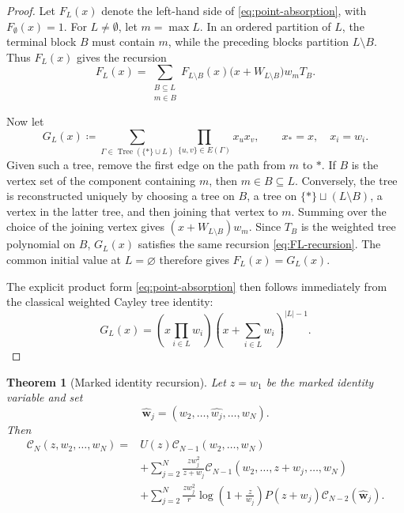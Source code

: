 \documentclass[letterpaper,12pt]{amsart}
\newtheorem{thm}{Theorem}[section]
\theoremstyle{definition}
\newcommand{\scrC}{\mathscr C}
\DeclareMathOperator{\Tree}{Tree}
\numberwithin{equation}{section}
\begin{document}
\begin{proof}
Let $F_L(x)$ denote the left-hand side of \eqref{eq:point-absorption}, with $F_\emptyset(x)=1$. For $L \neq \emptyset$, let $m = \max L$. In an ordered partition of
$L$, the terminal block $B$ must contain $m$, while the preceding blocks partition $L \setminus B$. Thus $F_L(x)$ gives the recursion
\begin{equation}
	F_L(x)=
	\sum_{\substack{B\subseteq L\\ m\in B}}
	F_{L\setminus B}(x)
	\bigl(x+W_{L\setminus B}\bigr)w_mT_B .
	\label{eq:FL-recursion}
\end{equation}

Now let
\[
  G_L(x)\coloneqq
  \sum_{\Gamma\in\Tree(\{*\}\cup L)}
  \prod_{\{u,v\}\in E(\Gamma)}x_ux_v,
  \qquad 
  x_*=x,
  \quad 
  x_i=w_i.
\]
Given such a tree, remove the first edge on the path from \(m\) to \(*\).
If \(B\) is the vertex set of the component containing \(m\), then
\(m\in B\subseteq L\).  Conversely, the tree is reconstructed uniquely by
choosing a tree on \(B\), a tree on
\(\{*\}\sqcup(L\setminus B)\), a vertex in the latter tree, and then joining
that vertex to \(m\).  Summing over the choice of the joining vertex gives
\((x+W_{L\setminus B})w_m\).
Since \(T_B\) is the weighted tree polynomial on \(B\), \(G_L(x)\) satisfies
the same recursion \eqref{eq:FL-recursion}.  The common initial value
at \(L=\varnothing\) therefore gives \(F_L(x)=G_L(x)\).
	
The explicit product form \eqref{eq:point-absorption} then follows immediately from the classical weighted Cayley tree identity:
\[
  G_L(x)
  =
  \left(x\prod_{i\in L}w_i\right)
  \left(x+\sum_{i\in L}w_i\right)^{|L|-1}.
\]
\end{proof}


\begin{thm}[Marked identity recursion]\label{thm:marked-recursion}
Let \(z=w_1\) be the marked identity variable and set
\[
  \widehat{\mathbf w}_j=(w_2,\ldots,\widehat{w_j},\ldots,w_N).
\]
Then
  \begin{equation}\label{eq:marked-recursion}
  \begin{aligned}
    \scrC_N(z,w_2,\ldots,w_N)
    ={}&U(z)\scrC_{N-1}(w_2,\ldots,w_N)
    \\
    &+\sum_{j=2}^{N}\frac{zw_j^2}{z+w_j}
    \scrC_{N-1}(w_2,\ldots,z+w_j,\ldots,w_N)
    \\
    &+\sum_{j=2}^{N}\frac{zw_j^2}{r}
    \log\left(1+\frac z{w_j}\right)
    P(z+w_j)\scrC_{N-2}(\widehat{\mathbf w}_j).
  \end{aligned}
  \end{equation}
\end{thm}
\end{document}
